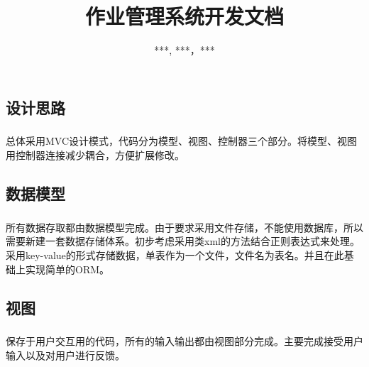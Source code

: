 \documentclass[notitlepage,cs4size,punct,oneside]{report}
\begin{document}
\begin{CJK}{UTF8}{hei} %


\renewcommand{\abstractname}{摘 \qquad 要}
\renewcommand{\contentsname}{\center 目\qquad\qquad 录}
\renewcommand{\listfigurename}{图 \quad 示 \quad 目 \quad 录}
\renewcommand{\listtablename}{表 \quad 格 \quad 目 \quad 录}
\renewcommand{\appendixname}{附录}
\renewcommand{\chaptername}{章节}
\renewcommand{\indexname}{\center 索 \qquad 引}
\renewcommand{\figurename}{图}
\renewcommand{\tablename}{表}

\newcommand{\upcite}[1]{\textsuperscript{\cite{#1}}}


\title{作业管理系统开发文档}
\author{***, ***，***}

\maketitle
\tableofcontents
\pagebreak



\chapter{设计思路}
\paragraph{}总体采用MVC设计模式，代码分为模型、视图、控制器三个部分。将模型、视图用控制器连接减少耦合，方便扩展修改。
\section{数据模型}
\paragraph{}所有数据存取都由数据模型完成。由于要求采用文件存储，不能使用数据库，所以需要新建一套数据存储体系。初步考虑采用类xml的方法结合正则表达式来处理。采用key-value的形式存储数据，单表作为一个文件，文件名为表名。并且在此基础上实现简单的ORM。
\section{视图}
\paragraph{}
保存于用户交互用的代码，所有的输入输出都由视图部分完成。主要完成接受用户输入以及对用户进行反馈。

\end{CJK}
\end{document}

